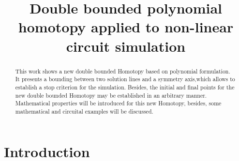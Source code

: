\documentclass[conference,letterpaper,onecolumn]{IEEEtran}
\begin{document}
\title{Double bounded polynomial homotopy applied to non-linear circuit simulation}

\author{
\and
{}
\and
{}
\and
{}
}

\maketitle

\begin{abstract}

This work shows a new double bounded Homotopy based on polynomial formulation. It presents a bounding between two solution lines and a symmetry axis,which allows to establish a stop criterion for the simulation. Besides, the initial and final points for the new double bounded Homotopy may be established in an arbitrary manner. Mathematical properties will be introduced for this new Homotopy, besides, some mathematical and circuital examples will be discussed.

\end{abstract}
 

\section{Introduction}
\end{document}
